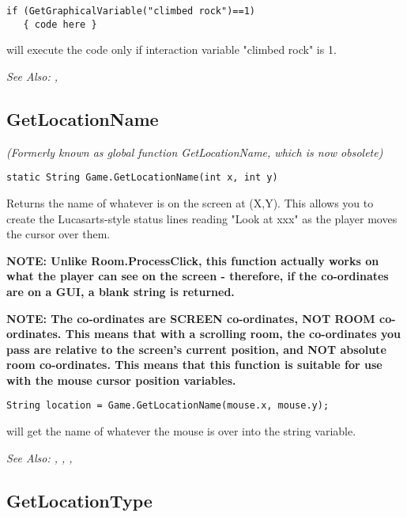 \begin{verbatim}
if (GetGraphicalVariable("climbed rock")==1)
   { code here }
\end{verbatim}
will execute the code only if interaction variable "climbed rock" is 1.

\it{See Also:} , 


\subsection{GetLocationName}\label{Game.GetLocationName}%

\it{(Formerly known as global function GetLocationName, which is now obsolete)}

\begin{verbatim}
static String Game.GetLocationName(int x, int y)
\end{verbatim}
Returns the name of whatever is on the screen at (X,Y). This allows you to
create the Lucasarts-style status lines reading "Look at xxx" as the player
moves the cursor over them.

\bf{NOTE:} Unlike Room.ProcessClick, this function actually works on what the player can
see on the screen - therefore, if the co-ordinates are on a GUI, a blank string is returned.

\bf{NOTE:} The co-ordinates are SCREEN co-ordinates, NOT ROOM co-ordinates. This
means that with a scrolling room, the co-ordinates you pass are relative to
the screen's current position, and NOT absolute room co-ordinates. This
means that this function is suitable for use with the mouse cursor position
variables.

\begin{verbatim}
String location = Game.GetLocationName(mouse.x, mouse.y);
\end{verbatim}
will get the name of whatever the mouse is over into the string variable.

\it{See Also:} , ,
, 


\subsection{GetLocationType}\label{GetLocationType}%

